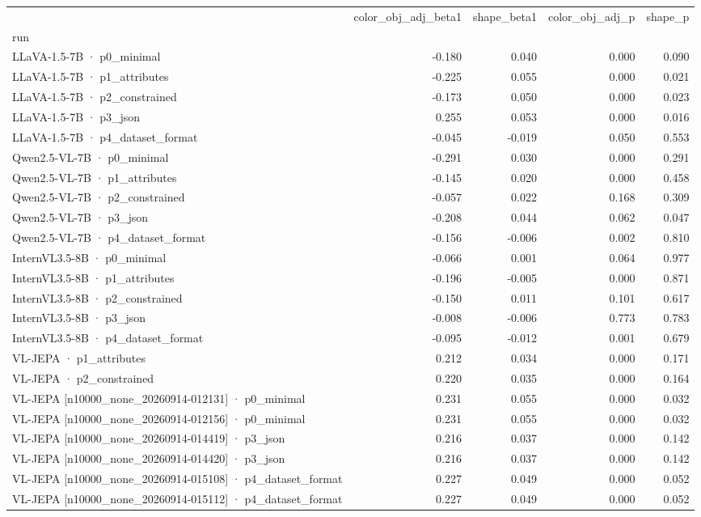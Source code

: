 \begin{tabular}{lrrrr}
\toprule
 & color\_obj\_adj\_beta1 & shape\_beta1 & color\_obj\_adj\_p & shape\_p \\
run &  &  &  &  \\
\midrule
LLaVA-1.5-7B · p0\_minimal & -0.180 & 0.040 & 0.000 & 0.090 \\
LLaVA-1.5-7B · p1\_attributes & -0.225 & 0.055 & 0.000 & 0.021 \\
LLaVA-1.5-7B · p2\_constrained & -0.173 & 0.050 & 0.000 & 0.023 \\
LLaVA-1.5-7B · p3\_json & 0.255 & 0.053 & 0.000 & 0.016 \\
LLaVA-1.5-7B · p4\_dataset\_format & -0.045 & -0.019 & 0.050 & 0.553 \\
Qwen2.5-VL-7B · p0\_minimal & -0.291 & 0.030 & 0.000 & 0.291 \\
Qwen2.5-VL-7B · p1\_attributes & -0.145 & 0.020 & 0.000 & 0.458 \\
Qwen2.5-VL-7B · p2\_constrained & -0.057 & 0.022 & 0.168 & 0.309 \\
Qwen2.5-VL-7B · p3\_json & -0.208 & 0.044 & 0.062 & 0.047 \\
Qwen2.5-VL-7B · p4\_dataset\_format & -0.156 & -0.006 & 0.002 & 0.810 \\
InternVL3.5-8B · p0\_minimal & -0.066 & 0.001 & 0.064 & 0.977 \\
InternVL3.5-8B · p1\_attributes & -0.196 & -0.005 & 0.000 & 0.871 \\
InternVL3.5-8B · p2\_constrained & -0.150 & 0.011 & 0.101 & 0.617 \\
InternVL3.5-8B · p3\_json & -0.008 & -0.006 & 0.773 & 0.783 \\
InternVL3.5-8B · p4\_dataset\_format & -0.095 & -0.012 & 0.001 & 0.679 \\
VL-JEPA · p1\_attributes & 0.212 & 0.034 & 0.000 & 0.171 \\
VL-JEPA · p2\_constrained & 0.220 & 0.035 & 0.000 & 0.164 \\
VL-JEPA [n10000\_none\_20260914-012131] · p0\_minimal & 0.231 & 0.055 & 0.000 & 0.032 \\
VL-JEPA [n10000\_none\_20260914-012156] · p0\_minimal & 0.231 & 0.055 & 0.000 & 0.032 \\
VL-JEPA [n10000\_none\_20260914-014419] · p3\_json & 0.216 & 0.037 & 0.000 & 0.142 \\
VL-JEPA [n10000\_none\_20260914-014420] · p3\_json & 0.216 & 0.037 & 0.000 & 0.142 \\
VL-JEPA [n10000\_none\_20260914-015108] · p4\_dataset\_format & 0.227 & 0.049 & 0.000 & 0.052 \\
VL-JEPA [n10000\_none\_20260914-015112] · p4\_dataset\_format & 0.227 & 0.049 & 0.000 & 0.052 \\
\bottomrule
\end{tabular}

